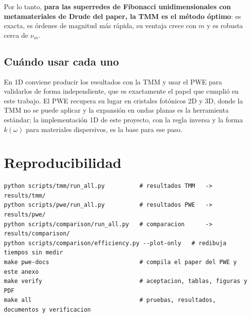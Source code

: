 \documentclass[11pt,a4paper]{article}
\begin{document}
Por lo tanto, \textbf{para las superredes de Fibonacci unidimensionales con
metamateriales de Drude del paper, la TMM es el método óptimo}: es exacta, es
órdenes de magnitud más rápida, su ventaja crece con $m$ y es robusta cerca de
$\nu_m$.

\subsection*{Cuándo usar cada uno}

En 1D conviene producir los resultados con la TMM y usar el PWE para validarlos de
forma independiente, que es exactamente el papel que cumplió en este trabajo. El
PWE recupera su lugar en cristales fotónicos 2D y 3D, donde la TMM no se puede
aplicar y la expansión en ondas planas es la herramienta estándar; la
implementación 1D de este proyecto, con la regla inversa y la forma $k(\omega)$
para materiales dispersivos, es la base para ese paso.

\section*{Reproducibilidad}
\begin{lstlisting}
python scripts/tmm/run_all.py          # resultados TMM   -> results/tmm/
python scripts/pwe/run_all.py          # resultados PWE   -> results/pwe/
python scripts/comparison/run_all.py   # comparacion      -> results/comparison/
python scripts/comparison/efficiency.py --plot-only   # redibuja tiempos sin medir
make pwe-docs                          # compila el paper del PWE y este anexo
make verify                            # aceptacion, tablas, figuras y PDF
make all                               # pruebas, resultados, documentos y verificacion
\end{lstlisting}
\end{document}
